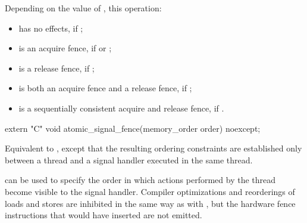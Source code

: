 \begin{itemdescr}
\pnum
\effects Depending on the value of , this operation:

\begin{itemize}
\item has no effects, if ;

\item is an acquire fence, if  or ;

\item is a release fence, if ;

\item is both an acquire fence and a release fence, if ;

\item is a sequentially consistent acquire and release fence, if .
\end{itemize}
\end{itemdescr}

%
\begin{itemdecl}
extern "C" void atomic_signal_fence(memory_order order) noexcept;
\end{itemdecl}

\begin{itemdescr}
\pnum
\effects Equivalent to , except that
the resulting ordering constraints are established only between a thread and a
signal handler executed in the same thread.

\pnum
\begin{note}
 can be used to specify the order in which actions
performed by the thread become visible to the signal handler.
Compiler optimizations and reorderings of loads and stores are inhibited in
the same way as with , but the hardware fence instructions
that  would have inserted are not emitted.
\end{note}
\end{itemdescr}
